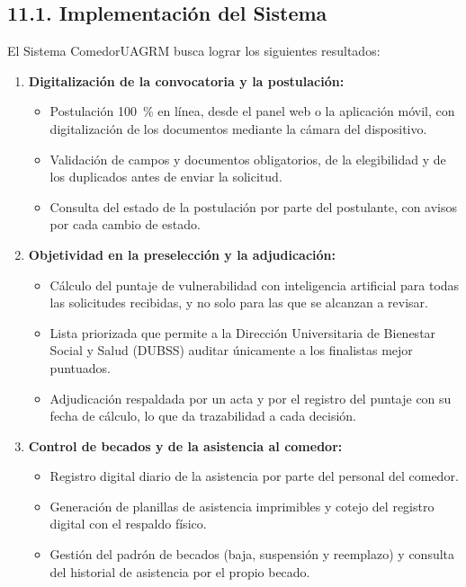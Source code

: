 \subsection{11.1. Implementación del Sistema}\label{sec:cap11_implementacion}

El Sistema ComedorUAGRM busca lograr los siguientes resultados:

\begin{enumerate}
    \item \textbf{Digitalización de la convocatoria y la postulación:}
    \begin{itemize}
        \item Postulación 100~\% en línea, desde el panel web o la aplicación móvil, con digitalización de los documentos mediante la cámara del dispositivo.
        \item Validación de campos y documentos obligatorios, de la elegibilidad y de los duplicados antes de enviar la solicitud.
        \item Consulta del estado de la postulación por parte del postulante, con avisos por cada cambio de estado.
    \end{itemize}

    \item \textbf{Objetividad en la preselección y la adjudicación:}
    \begin{itemize}
        \item Cálculo del puntaje de vulnerabilidad con inteligencia artificial para todas las solicitudes recibidas, y no solo para las que se alcanzan a revisar.
        \item Lista priorizada que permite a la Dirección Universitaria de Bienestar Social y Salud (DUBSS) auditar únicamente a los finalistas mejor puntuados.
        \item Adjudicación respaldada por un acta y por el registro del puntaje con su fecha de cálculo, lo que da trazabilidad a cada decisión.
    \end{itemize}

    \item \textbf{Control de becados y de la asistencia al comedor:}
    \begin{itemize}
        \item Registro digital diario de la asistencia por parte del personal del comedor.
        \item Generación de planillas de asistencia imprimibles y cotejo del registro digital con el respaldo físico.
        \item Gestión del padrón de becados (baja, suspensión y reemplazo) y consulta del historial de asistencia por el propio becado.
    \end{itemize}


\end{enumerate}
